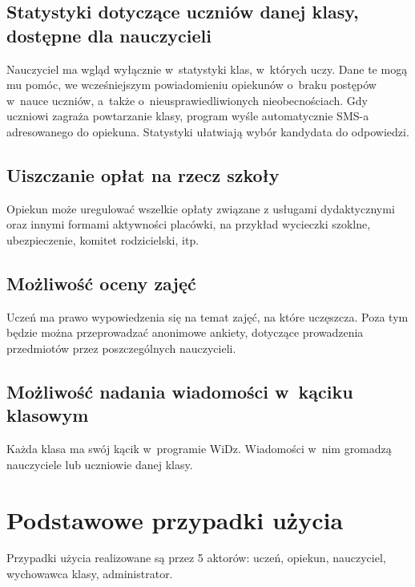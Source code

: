 \documentclass[12pt,leqno,twoside]{mwart}
\begin{document}
\subsection{Statystyki dotyczące uczniów danej klasy, dostępne dla nauczycieli}
\noindent Nauczyciel ma wgląd wyłącznie w~statystyki klas, w~których uczy. Dane te mogą mu pomóc, we wcześniejszym powiadomieniu opiekunów o~braku postępów w~nauce uczniów, a~także o~nieusprawiedliwionych nieobecnościach. Gdy uczniowi zagraża powtarzanie klasy, program wyśle automatycznie SMS-a adresowanego do opiekuna. Statystyki ułatwiają wybór kandydata do odpowiedzi.
\subsection{Uiszczanie opłat na rzecz szkoły}
\noindent Opiekun może uregulować wszelkie opłaty związane z usługami dydaktycznymi oraz innymi formami aktywności placówki, na przykład wycieczki szoklne, ubezpieczenie, komitet rodzicielski, itp.
\subsection{Możliwość oceny zajęć}
\noindent Uczeń ma prawo wypowiedzenia się na temat zajęć, na które uczęszcza. Poza tym będzie można przeprowadzać anonimowe ankiety, dotyczące prowadzenia przedmiotów przez poszczególnych nauczycieli.
\subsection{Możliwość nadania wiadomości w~kąciku klasowym}
\noindent Każda klasa ma swój kącik w~programie WiDz. Wiadomości w~nim gromadzą nauczyciele lub uczniowie danej klasy.

\section{Podstawowe przypadki użycia}
\noindent Przypadki użycia realizowane są przez 5 aktorów: uczeń, opiekun, nauczyciel, wychowawca klasy, administrator.
\end{document}
